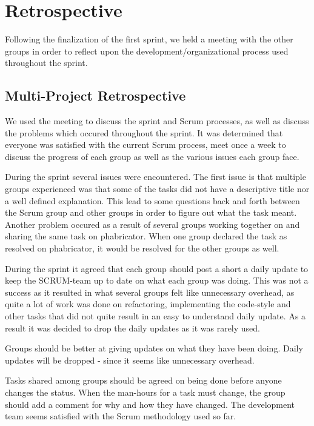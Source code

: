 \section{Retrospective}
Following the finalization of the first sprint, we held a meeting with the other
groups in order to reflect upon the development/organizational process used
throughout the sprint. 

\subsection{Multi-Project Retrospective}


We used the meeting to discuss the sprint and Scrum processes, as well as
discuss the problems which occured throughout the sprint. It was determined that
everyone was satisfied with the current Scrum process, meet once a week to
discuss the progress of each group as well as the various issues each group
face.

During the sprint several issues were encountered. The first issue is that
multiple groups experienced was that some of the tasks did not have a
descriptive title nor a well defined explanation. This lead to some questions
back and forth between the Scrum group and other groups in order to figure out
what the task meant. Another problem occured as a result of several groups
working together on and sharing the same task on phabricator. When one group
declared the task as resolved on phabricator, it would be resolved for the
other groups as well.


During the sprint it agreed that each group should post a short a daily update
to keep the SCRUM-team up to date on what each group was doing. This was not a
success as it resulted in what several groups felt like unnecessary overhead, as
quite a lot of work was done on refactoring, implementing the code-style and
other tasks that did not quite result in an easy to understand daily update. As
a result it was decided to drop the daily updates as it was rarely used.







Groups should be better at giving updates on what they have been doing.
Daily updates will be dropped - since it seems like unnecessary overhead.

Tasks shared among groups should be agreed on being done before anyone changes the status.
When the man-hours for a task must change, the group should add a comment for why and how they have changed.
The development team seems satisfied with the Scrum methodology used so far.

